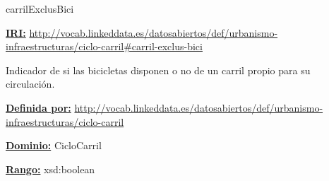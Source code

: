 \begin{mybox}{carrilExclusBici}
\begin{flushleft}
\underline{\textbf{IRI:}}
\url{http://vocab.linkeddata.es/datosabiertos/def/urbanismo-infraestructuras/ciclo-carril#carril-exclus-bici}
\newline

Indicador de si las bicicletas disponen o no de un carril propio para su circulación.
\newline


\underline{\textbf{Definida por:}}\newline
\url{http://vocab.linkeddata.es/datosabiertos/def/urbanismo-infraestructuras/ciclo-carril}
\newline

\underline{\textbf{Dominio:}}
	CicloCarril
\newline

\underline{\textbf{Rango:}}
	xsd:boolean
\newline

\end{flushleft}
\end{mybox}







